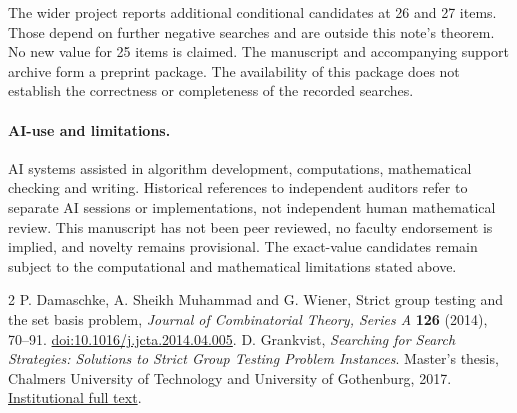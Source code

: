 \documentclass[11pt]{article}
\begin{document}
The wider project reports additional conditional candidates at 26 and 27 items. Those depend on further negative searches and are outside this note's theorem. No new value for 25 items is claimed. The manuscript and accompanying support archive form a preprint package. The availability of this package does not establish the correctness or completeness of the recorded searches.

\paragraph{AI-use and limitations.}
AI systems assisted in algorithm development, computations, mathematical checking and writing. Historical references to independent auditors refer to separate AI sessions or implementations, not independent human mathematical review. This manuscript has not been peer reviewed, no faculty endorsement is implied, and novelty remains provisional. The exact-value candidates remain subject to the computational and mathematical limitations stated above.

\begin{thebibliography}{2}
 P. Damaschke, A. Sheikh Muhammad and G. Wiener,
Strict group testing and the set basis problem,
\emph{Journal of Combinatorial Theory, Series A} \textbf{126} (2014), 70--91.
\href{https://doi.org/10.1016/j.jcta.2014.04.005}{doi:10.1016/j.jcta.2014.04.005}.
 D. Grankvist,
\emph{Searching for Search Strategies: Solutions to Strict Group Testing Problem Instances}.
Master's thesis, Chalmers University of Technology and University of Gothenburg, 2017.
\href{https://odr.chalmers.se/server/api/core/bitstreams/0ce48183-ab4e-444b-8372-8da3b9d93907/content}{Institutional full text}.
\end{thebibliography}
\end{document}

